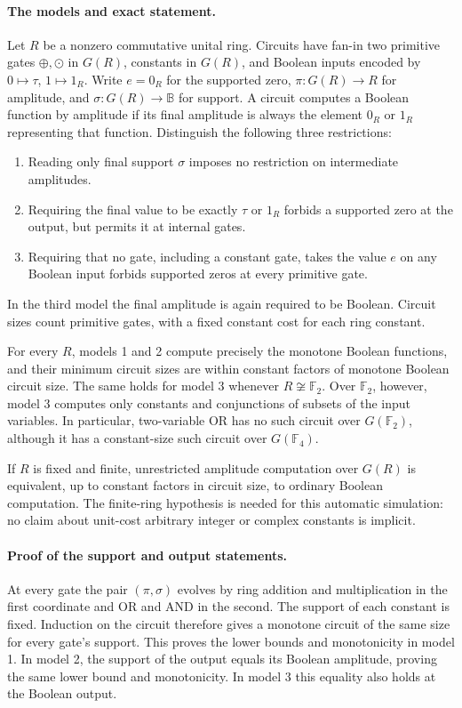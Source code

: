 \paragraph{The models and exact statement.}
Let $R$ be a nonzero commutative unital ring. Circuits have fan-in two
primitive gates $\oplus,\odot$ in $G(R)$, constants in $G(R)$, and
Boolean inputs encoded by $0\mapsto\tau$, $1\mapsto1_R$.
Write $e=0_R$ for the supported zero, $\pi:G(R)\to R$ for amplitude,
and $\sigma:G(R)\to\mathbb B$ for support. A circuit computes a
Boolean function by amplitude if its final amplitude is always the
element $0_R$ or $1_R$ representing that function. Distinguish the
following three restrictions:
\begin{enumerate}
\item Reading only final support $\sigma$ imposes no restriction on
      intermediate amplitudes.
\item Requiring the final value to be exactly $\tau$ or $1_R$ forbids
      a supported zero at the output, but permits it at internal gates.
\item Requiring that no gate, including a constant gate, takes the
      value $e$ on any Boolean input forbids supported zeros at every
      primitive gate.
\end{enumerate}
In the third model the final amplitude is again required to be Boolean.
Circuit sizes count primitive gates, with a fixed constant cost for each
ring constant.

For every $R$, models 1 and 2 compute precisely the monotone Boolean
functions, and their minimum circuit sizes are within constant factors
of monotone Boolean circuit size. The same holds for model 3 whenever
$R\not\cong\mathbb F_2$. Over $\mathbb F_2$, however, model 3 computes
only constants and conjunctions of subsets of the input variables.
In particular, two-variable OR has no such circuit over $G(\mathbb F_2)$,
although it has a constant-size such circuit over $G(\mathbb F_4)$.

If $R$ is fixed and finite, unrestricted amplitude computation over
$G(R)$ is equivalent, up to constant factors in circuit size, to ordinary
Boolean computation. The finite-ring hypothesis is needed for this
automatic simulation: no claim about unit-cost arbitrary integer or
complex constants is implicit.

\paragraph{Proof of the support and output statements.}
At every gate the pair $(\pi,\sigma)$ evolves by ring addition and
multiplication in the first coordinate and OR and AND in the second.
The support of each constant is fixed. Induction on the circuit therefore
gives a monotone circuit of the same size for every gate's support.
This proves the lower bounds and monotonicity in model 1. In model 2,
the support of the output equals its Boolean amplitude, proving the same
lower bound and monotonicity. In model 3 this equality also holds at the
Boolean output.

